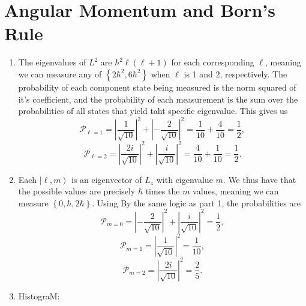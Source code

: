\documentclass[11pt, letterpaper]{article}
\renewcommand{\ket}[1]{\left\vert #1 \right\rangle}
\begin{document}
\section{Angular Momentum and Born's Rule}
\begin{enumerate}
	\item The eigenvalues of $L^2$ are $\hbar ^2\ell (\ell +1)$ for each corresponding $\ell $, meaning we can measure any of $\left\{ 2\hbar ^2,6\hbar ^2 \right\} $ when $\ell $ is 1 and 2, respectively. The probability of each component state being measured is the norm squared of it's coefficient, and the probability of each measurement is the sum over the probabilities of all states that yield taht specific eigenvalue. This gives us
		\[
			\mathcal{P}_{\ell =1} =\left| \frac{1}{\sqrt{10} }  \right| ^2+\left| -\frac{2}{\sqrt{10} }  \right| ^2=\frac{1}{10} +\frac{4}{10} =\frac{1}{2} 	,
		\]
		\[
			\mathcal{P}_{\ell =2} =\left| \frac{2i}{\sqrt{10} }  \right| ^2+\left| \frac{i}{\sqrt{10} }  \right| ^2=\frac{4}{10} +\frac{1}{10} =\frac{1}{2} 
		.\]
	\item Each $\ket{\ell ,m} $ is an eigenvector of $L_z$ with eigenvalue $m$. We thus have that the possible values are precisely $\hbar $ times the $m$ values, meaning we can measure $\left\{ 0,\hbar ,2\hbar  \right\} $. Using By the same logic as part 1, the probabilities are
		\[
			\mathcal{P}_{m=0} =\left| -\frac{2}{\sqrt{10} }  \right| ^2+\left| \frac{i}{\sqrt{10} }  \right| ^2=\frac{1}{2} 
		,\]
		\[
			\mathcal{P}_{m=1} =\left| \frac{1}{\sqrt{10} }  \right| ^2=\frac{1}{10} ,
		\]
		\[
			\mathcal{P}_{m=2} =\left| \frac{2i}{\sqrt{10} }  \right| ^2=\frac{2}{5} 
		.\]
	\item HistograM:
\begin{center}

\end{center}
		
\end{enumerate}
\end{document}

